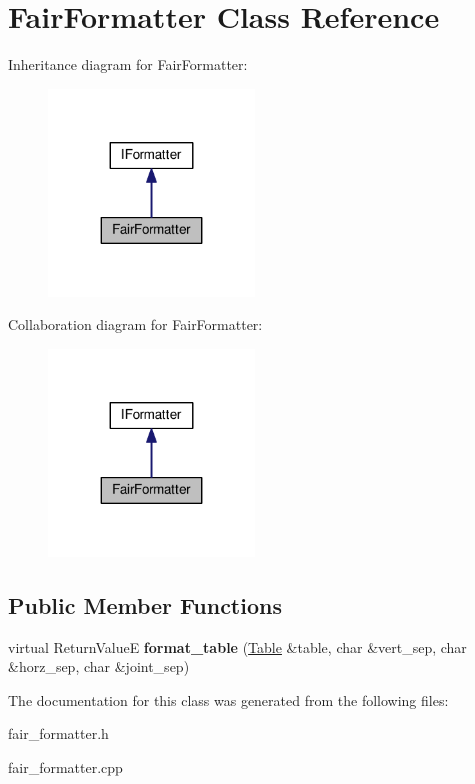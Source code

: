 \hypertarget{classFairFormatter}{}\section{Fair\+Formatter Class Reference}
\label{classFairFormatter}


Inheritance diagram for Fair\+Formatter\+:\nopagebreak
\begin{figure}[H]
\begin{center}
\leavevmode
\includegraphics[width=155pt]{classFairFormatter__inherit__graph}
\end{center}
\end{figure}


Collaboration diagram for Fair\+Formatter\+:\nopagebreak
\begin{figure}[H]
\begin{center}
\leavevmode
\includegraphics[width=155pt]{classFairFormatter__coll__graph}
\end{center}
\end{figure}
\subsection*{Public Member Functions}
\begin{DoxyCompactItemize}
\item 
\hypertarget{classFairFormatter_aac192190ad2cd8e5e4502244a018349c}{}virtual Return\+Value\+E {\bfseries format\+\_\+table} (\hyperlink{classTable}{Table} \&table, char \&vert\+\_\+sep, char \&horz\+\_\+sep, char \&joint\+\_\+sep)\label{classFairFormatter_aac192190ad2cd8e5e4502244a018349c}

\end{DoxyCompactItemize}


The documentation for this class was generated from the following files\+:\begin{DoxyCompactItemize}
\item 
fair\+\_\+formatter.\+h\item 
fair\+\_\+formatter.\+cpp\end{DoxyCompactItemize}
